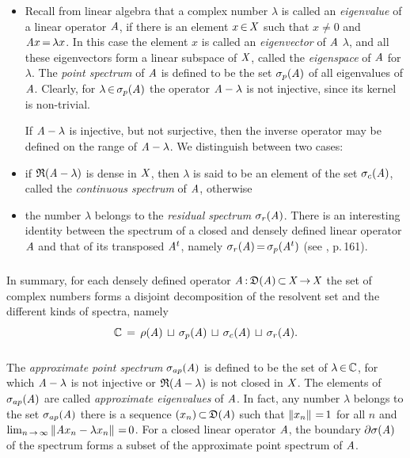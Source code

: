 \documentclass[11pt,twoside]{article}
\begin{document}
\begin{itemize}[leftmargin=15pt]
\item[1.]
Recall from linear algebra
that a complex number $\lambda$ is called an \textit{eigenvalue}
of a linear operator $\mathit{A}$,
if there is an element $x {\,\in\,} \mathit{X}$ such that
$x \neq 0$ and $\mathit{A} x {\,=\,} \lambda x$.
In this case the element $x$ is called an \textit{eigenvector} of $\mathit{A}$
{\wrt} $\lambda$,
and all these eigenvectors form a linear subspace of $\mathit{X}$,
called the \textit{eigenspace} of $\mathit{A}$ for $\lambda$.
The \textit{point spectrum} of $\mathit{A}$ is defined to be
the set $\sigma_p(\mathit{A})$ of all eigenvalues of $\mathit{A}$.
Clearly,
for $\lambda {\,\in\,} \sigma_p(\mathit{A})$ the operator
$\mathit{A} - \lambda$ is not injective,
since its kernel is non-trivial.

If $\mathit{A} - \lambda$ is injective,
but not surjective,
then the inverse operator may be defined
on the range of $\mathit{A} - \lambda$.
We distinguish between two cases:

\item[2a.]
if $\mathfrak{R}(\mathit{A} - \lambda)$ is dense in $\mathit{X}$,
then $\lambda$ is said to be an element of the set $\sigma_c(\mathit{A})$,
called the \textit{continuous spectrum} of $\mathit{A}$,
otherwise

\item[2b.]
the number $\lambda$ belongs to the \textit{residual spectrum}
$\sigma_r(\mathit{A})$.
There is an interesting identity between the spectrum
of a closed and densely defined linear operator $\mathit{A}$
and that of its transposed $\mathit{A}^t$, namely
$\sigma_r(\mathit{A}) {\,=\,} \sigma_p(\mathit{A}^t)$ (see \cite{EN}, p.\,161).
\end{itemize}

\subparagraph*{}
In summary,
for each densely defined operator
$\mathit{A} {\,:\,} \mathfrak{D}(\mathit{A}) {\,\subset\,} \mathit{X} {\,\to\,} \mathit{X}$
the set of complex numbers forms a disjoint decomposition
of the resolvent set and the different kinds of spectra, namely
\[
{\mathbb{C}} \,=\, \rho    (\mathit{A}) \, \sqcup
        \, \sigma_p(\mathit{A}) \, \sqcup
        \, \sigma_c(\mathit{A}) \, \sqcup
        \, \sigma_r(\mathit{A}).
\]

\subparagraph*{}
The \textit{approximate point spectrum} $\sigma_{ap}(\mathit{A})$ is
defined to be the set of $\lambda {\,\in\,} {\mathbb{C}}$,
for which $\mathit{A}-\lambda$ is not injective or $\mathfrak{R}(\mathit{A}-\lambda)$
is not closed in $\mathit{X}$.
The elements of $\sigma_{ap}(\mathit{A})$ are called
\textit{approximate eigenvalues} of $\mathit{A}$.
In fact,
any number $\lambda$ belongs to the set $\sigma_{ap}(\mathit{A})$
\iff
there is a sequence $(x_n) {\,\subset\,} \mathfrak{D}(\mathit{A})$ such that
$\left\lVert x_n \right\rVert {\,=\,} 1$ for all $n$ and
$\lim_{n {\,\to\,} \infty} \left\lVert \mathit{A} x_n - \lambda x_n \right\rVert {\,=\,} 0$.
For a closed linear operator $\mathit{A}$,
the boundary $\partial \sigma(\mathit{A})$ of the spectrum 
forms a subset of the approximate point spectrum of $\mathit{A}$.
\end{document}
